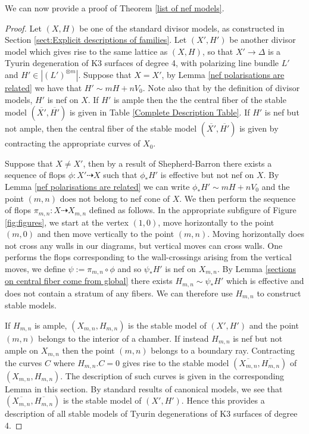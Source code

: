\documentclass[a4paper]{amsart}
\theoremstyle{definition}
\theoremstyle{plain}
\theoremstyle{remark}
\begin{document}
We can now provide a proof of Theorem \ref{list of nef models}.
\renewcommand{\proofname}{Proof of Theorem \ref{list of nef models}}
\begin{proof}

Let $(X,H)$ be one of the standard divisor models, as constructed in Section \ref{sect:Explicit descriptions of families}. Let $(X',H')$ be another divisor model which gives rise to the same lattice as $(X,H)$, so that $X'\rightarrow \Delta$ is a Tyurin degeneration of K3 surfaces of degree 4, with polarizing line bundle $L'$ and $H'\in|(L')^{\otimes m}|$. Suppose that $X=X'$, by Lemma \ref{nef polarisations are related} we have that $H'\sim mH+nV_0$. Note also that by the definition of divisor models, $H'$ is nef on $X$. If $H'$ is ample then the the central fiber of the stable model $(\overline{X'},\overline{H'})$ is given in Table \ref{Complete Description Table}. If $H'$ is nef but not ample, then the central fiber of the stable model $(\overline{X'},\overline{H'})$ is given by contracting the appropriate curves of $X_0$.

Suppose that $X\neq X'$, then by a result of Shepherd-Barron \cite[Corollary 3.1]{SB83} there exists a sequence of flops $\phi:X'\dashrightarrow X$ such that $\phi_*H'$ is effective but not nef on $X$. By Lemma \ref{nef polarisations are related} we can write $\phi_*H'\sim mH+nV_0$ and the point $(m,n)$ does not belong to nef cone of $X$. We then perform the sequence of flops $\pi_{m,n}:X\dashrightarrow X_{m,n}$ defined as follows. In the appropriate subfigure of Figure \ref{fig:figures}, we start at the vertex $(1,0)$, move horizontally to the point $(m,0)$ and then move vertically to the point $(m,n)$. Moving horizontally does not cross any walls in our diagrams, but vertical moves can cross walls. One performs the flops corresponding to the wall-crossings arising from the vertical moves, we define $\psi:=\pi_{m,n}\circ\phi$ and so $\psi_*H'$ is nef on $X_{m,n}$. By Lemma \ref{sections on central fiber come from global} there exists $H_{m,n} \sim \psi_*H'$ which is effective and does not contain a stratum of any fibers. We can therefore use $H_{m,n}$ to construct stable models.

If $H_{m,n}$ is ample, $(X_{m,n}, H_{m,n})$ is the stable model of $(X',H')$ and the point $(m,n)$ belongs to the interior of a chamber. 
If instead $H_{m,n}$ is nef but not ample on $X_{m,n}$ then the point $(m,n)$ belongs to a boundary ray. Contracting the curves $C$ where $H_{m,n}.C=0$ gives rise to the stable model $(\overline{X_{m,n}},\overline{H_{m,n}})$ of $(X_{m,n},H_{m,n})$. The description of such curves is given in the corresponding Lemma in this section. By standard results of canonical models, we see that $(\overline{X_{m,n}},\overline{H_{m,n}})$ is the stable model of $(X',H')$. Hence this provides a description of all stable models of Tyurin degenerations of K3 surfaces of degree 4.
\end{proof}
\renewcommand{\proofname}{Proof}
\end{document}
